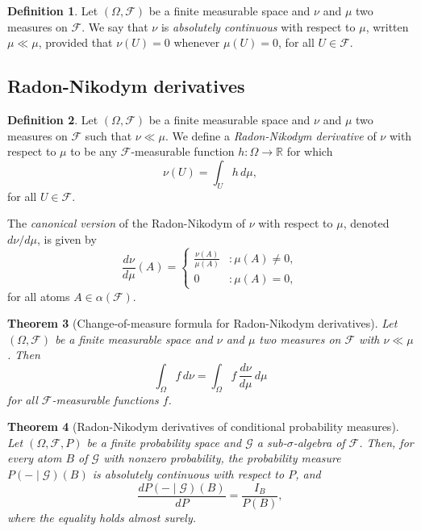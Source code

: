 \documentclass[11pt]{book}
\newtheorem{thm}{Theorem}[section]
\theoremstyle{definition}
\newtheorem{defn}[thm]{Definition}
\numberwithin{equation}{section}
\begin{document}
\begin{defn}
	Let $(\Omega, \mathcal{F})$ be a finite measurable space and $\nu$ and $\mu$ two measures on $\mathcal{F}$. We say that $\nu$ is \textit{absolutely continuous} with respect to $\mu$, written $\mu \ll \mu$,  provided that $\nu(U)=0$ whenever $\mu(U) = 0$, for all $U \in \mathcal{F}$.
\end{defn}

\subsection{Radon-Nikodym derivatives}

\begin{defn}
	Let $(\Omega, \mathcal{F})$ be a finite measurable space and $\nu$ and $\mu$ two measures on $\mathcal{F}$ such that $\nu \ll \mu$. We define a \textit{Radon-Nikodym derivative} of $\nu$ with respect to $\mu$ to be any $\mathcal{F}$-measurable function $h: \Omega \to \mathbb{R}$ for which
	\[
		\nu(U) = \int_U h \, d\mu,
	\]
	for all $U\in \mathcal{F}$.
\end{defn}

The \textit{canonical version} of the Radon-Nikodym of $\nu$ with respect to $\mu$, denoted $d\nu / d\mu$, is given by
\[
	\frac{d\nu}{d\mu}(A) = \begin{cases} \frac{\nu(A)}{\mu(A)} & : \mu(A) \neq 0, \\
	              0                     & : \mu(A) = 0,
	\end{cases}
\]
for all atoms $A\in \alpha(\mathcal{F})$.

\begin{thm}[Change-of-measure formula for Radon-Nikodym derivatives]\label{thm:change-vars}
	Let $(\Omega, \mathcal{F})$ be a finite measurable space and $\nu$ and $\mu$ two measures on $\mathcal{F}$ with $\nu \ll \mu$. Then
	\[
		\int_\Omega f \, d\nu = \int_\Omega f \, \frac{d\nu}{d\mu} \, d\mu
	\]
	for all $\mathcal{F}$-measurable functions $f$.
\end{thm}

\begin{thm}[Radon-Nikodym derivatives of conditional probability measures]
	Let $(\Omega, \mathcal{F}, P)$ be a finite probability space and $\mathcal{G}$ a sub-$\sigma$-algebra of $\mathcal{F}$. Then, for every atom $B$ of $\mathcal{G}$ with nonzero probability, the probability measure $P(- \mid \mathcal{G})(B)$ is absolutely continuous with respect to $P$, and
	\[
		\frac{d P(- \mid \mathcal{G})(B)}{dP} = \frac{I_B}{P(B)},
	\]
	where the equality holds almost surely.
\end{thm}
\end{document}

